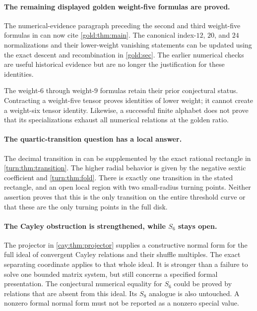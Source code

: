 \paragraph{The remaining displayed golden weight-five formulas are proved.}
The numerical-evidence paragraph preceding the second and third
weight-five formulas in  can now cite
\cref{gold:thm:main}. The canonical index-$12$, $20$, and $24$
normalizations and their lower-weight vanishing statements can be
updated using the exact descent and recombination in
\cref{gold:sec}. The earlier numerical checks are useful historical
evidence but are no longer the justification for these identities.

The weight-$6$ through weight-$9$ formulas retain their prior
conjectural status. Contracting a weight-five tensor proves identities
of lower weight; it cannot create a weight-six tensor identity.
Likewise, a successful finite alphabet does not prove that its
specializations exhaust all numerical relations at the golden ratio.

\paragraph{The quartic-transition question has a local answer.}
The decimal transition in  can be
supplemented by the exact rational rectangle in
\cref{turn:thm:transition}. The higher radial behavior is given by the
negative sextic coefficient and \cref{turn:thm:fold}. There is exactly
one transition in the stated rectangle, and an open local region with
two small-radius turning points. Neither assertion proves that this is
the only transition on the entire threshold curve or that these are
the only turning points in the full disk.

\paragraph{The Cayley obstruction is strengthened, while $S_6$ stays open.}
The projector in \cref{cay:thm:projector} supplies a constructive
normal form for the full ideal of convergent Cayley relations and
their shuffle multiples. The exact separating coordinate applies to
that whole ideal. It is stronger than a failure to solve one bounded
matrix system, but still concerns a specified formal presentation.
The conjectural numerical equality for $S_6$ could be proved by
relations that are absent from this ideal. Its $S_8$ analogue is also
untouched. A nonzero formal normal form must not be reported as a
nonzero special value.

